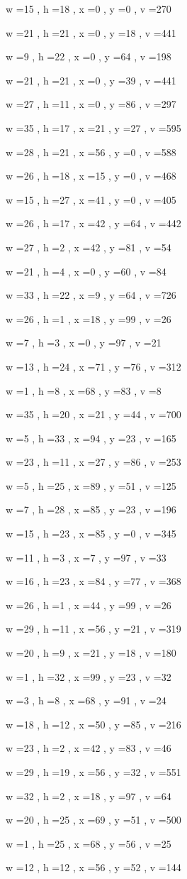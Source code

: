 \documentclass[11pt]{article}
\begin{document}
w =15 , h =18 , x =0 , y =0 , v =270
\par
w =21 , h =21 , x =0 , y =18 , v =441
\par
w =9 , h =22 , x =0 , y =64 , v =198
\par
w =21 , h =21 , x =0 , y =39 , v =441
\par
w =27 , h =11 , x =0 , y =86 , v =297
\par
w =35 , h =17 , x =21 , y =27 , v =595
\par
w =28 , h =21 , x =56 , y =0 , v =588
\par
w =26 , h =18 , x =15 , y =0 , v =468
\par
w =15 , h =27 , x =41 , y =0 , v =405
\par
w =26 , h =17 , x =42 , y =64 , v =442
\par
w =27 , h =2 , x =42 , y =81 , v =54
\par
w =21 , h =4 , x =0 , y =60 , v =84
\par
w =33 , h =22 , x =9 , y =64 , v =726
\par
w =26 , h =1 , x =18 , y =99 , v =26
\par
w =7 , h =3 , x =0 , y =97 , v =21
\par
w =13 , h =24 , x =71 , y =76 , v =312
\par
w =1 , h =8 , x =68 , y =83 , v =8
\par
w =35 , h =20 , x =21 , y =44 , v =700
\par
w =5 , h =33 , x =94 , y =23 , v =165
\par
w =23 , h =11 , x =27 , y =86 , v =253
\par
w =5 , h =25 , x =89 , y =51 , v =125
\par
w =7 , h =28 , x =85 , y =23 , v =196
\par
w =15 , h =23 , x =85 , y =0 , v =345
\par
w =11 , h =3 , x =7 , y =97 , v =33
\par
w =16 , h =23 , x =84 , y =77 , v =368
\par
w =26 , h =1 , x =44 , y =99 , v =26
\par
w =29 , h =11 , x =56 , y =21 , v =319
\par
w =20 , h =9 , x =21 , y =18 , v =180
\par
w =1 , h =32 , x =99 , y =23 , v =32
\par
w =3 , h =8 , x =68 , y =91 , v =24
\par
w =18 , h =12 , x =50 , y =85 , v =216
\par
w =23 , h =2 , x =42 , y =83 , v =46
\par
w =29 , h =19 , x =56 , y =32 , v =551
\par
w =32 , h =2 , x =18 , y =97 , v =64
\par
w =20 , h =25 , x =69 , y =51 , v =500
\par
w =1 , h =25 , x =68 , y =56 , v =25
\par
w =12 , h =12 , x =56 , y =52 , v =144
\par
\newpage
\end{document}
